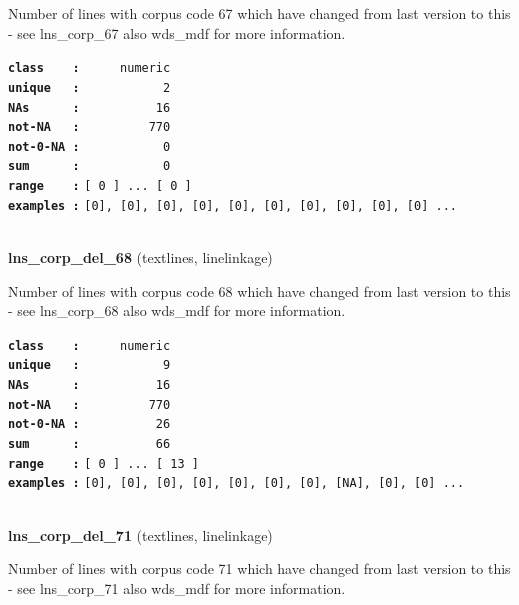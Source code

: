 \documentclass[]{article}
\begin{document}
Number of lines with corpus code 67 which have changed from last version
to this - see lns\_corp\_67 also wds\_mdf for more information.

\textbf{\texttt{class\ \ \ \ :}} \texttt{~~~~~numeric}\\
\textbf{\texttt{unique\ \ \ :}} \texttt{~~~~~~~~~~~2}\\
\textbf{\texttt{NAs\ \ \ \ \ \ :}} \texttt{~~~~~~~~~~16}\\
\textbf{\texttt{not-NA\ \ \ :}} \texttt{~~~~~~~~~770}\\
\textbf{\texttt{not-0-NA\ :}} \texttt{~~~~~~~~~~~0}\\
\textbf{\texttt{sum\ \ \ \ \ \ :}} \texttt{~~~~~~~~~~~0}\\
\textbf{\texttt{range\ \ \ \ :}}
\texttt{{[}\ 0\ {]}\ ...\ {[}\ 0\ {]}}\\
\textbf{\texttt{examples\ :}}
\texttt{{[}0{]},\ {[}0{]},\ {[}0{]},\ {[}0{]},\ {[}0{]},\ {[}0{]},\ {[}0{]},\ {[}0{]},\ {[}0{]},\ {[}0{]}\ ...}\\

~

\textbf{lns\_corp\_del\_68} (textlines, linelinkage)

Number of lines with corpus code 68 which have changed from last version
to this - see lns\_corp\_68 also wds\_mdf for more information.

\textbf{\texttt{class\ \ \ \ :}} \texttt{~~~~~numeric}\\
\textbf{\texttt{unique\ \ \ :}} \texttt{~~~~~~~~~~~9}\\
\textbf{\texttt{NAs\ \ \ \ \ \ :}} \texttt{~~~~~~~~~~16}\\
\textbf{\texttt{not-NA\ \ \ :}} \texttt{~~~~~~~~~770}\\
\textbf{\texttt{not-0-NA\ :}} \texttt{~~~~~~~~~~26}\\
\textbf{\texttt{sum\ \ \ \ \ \ :}} \texttt{~~~~~~~~~~66}\\
\textbf{\texttt{range\ \ \ \ :}}
\texttt{{[}\ 0\ {]}\ ...\ {[}\ 13\ {]}}\\
\textbf{\texttt{examples\ :}}
\texttt{{[}0{]},\ {[}0{]},\ {[}0{]},\ {[}0{]},\ {[}0{]},\ {[}0{]},\ {[}0{]},\ {[}NA{]},\ {[}0{]},\ {[}0{]}\ ...}\\

~

\textbf{lns\_corp\_del\_71} (textlines, linelinkage)

Number of lines with corpus code 71 which have changed from last version
to this - see lns\_corp\_71 also wds\_mdf for more information.
\end{document}
